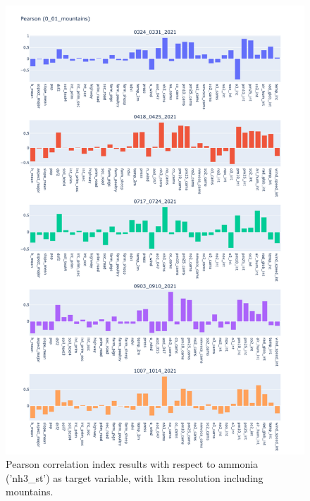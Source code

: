 \begin{figure}[H]
    \centering
    \includegraphics[scale=0.35]{images/tests/0_01_mountainsnh3_st_pearson.png}
    \caption{Pearson correlation index results with respect to ammonia ('nh3\_st') as target variable, with 1km resolution including mountains.}
    
\end{figure}
